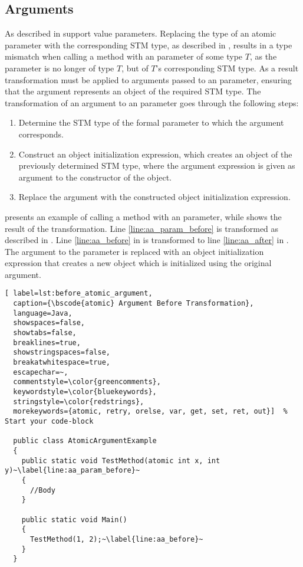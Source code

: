 \subsection{Arguments}
As described in  \stmnamesp support value parameters. Replacing the type of an atomic parameter with the corresponding \ac{STM} type, as described in , results in a type mismatch when calling a method with an  parameter of some type $T$, as the parameter is no longer of type $T$, but of $T$'s corresponding \ac{STM} type. As a result transformation must be applied to arguments passed to an  parameter, ensuring that the argument represents an object of the required \ac{STM} type. The transformation of an argument to an  parameter goes through the following steps:

\begin{enumerate}
	\item Determine the \ac{STM} type of the formal parameter to which the argument corresponds.
	\item Construct an object initialization expression, which creates an object of the previously determined \ac{STM} type, where the argument expression is given as argument to the constructor of the object.
	\item Replace the argument with the constructed object initialization expression.
\end{enumerate}

 presents an example of calling a method with an  parameter, while  shows the result of the transformation. Line \ref{line:aa_param_before} is transformed as described in . Line \ref{line:aa_before} in  is transformed to line \ref{line:aa_after} in . The argument to the  parameter is replaced with an object initialization expression that creates a new  object which is initialized using the original argument.

\begin{lstlisting}[ label=lst:before_atomic_argument,
  caption={\bscode{atomic} Argument Before Transformation},
  language=Java,  
  showspaces=false,
  showtabs=false,
  breaklines=true,
  showstringspaces=false,
  breakatwhitespace=true,
  escapechar=~,
  commentstyle=\color{greencomments},
  keywordstyle=\color{bluekeywords},
  stringstyle=\color{redstrings},
  morekeywords={atomic, retry, orelse, var, get, set, ret, out}]  % Start your code-block

  public class AtomicArgumentExample
  {
    public static void TestMethod(atomic int x, int y)~\label{line:aa_param_before}~
    {
      //Body
    }

    public static void Main()
    {
      TestMethod(1, 2);~\label{line:aa_before}~
    }
  }
\end{lstlisting}

